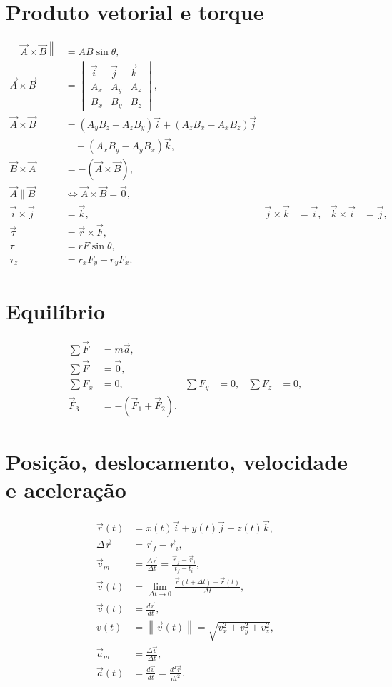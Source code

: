 \documentclass[12pt,a4paper]{article}
\newcommand{\vi}{\vec{i}}
\newcommand{\vj}{\vec{j}}
\newcommand{\vk}{\vec{k}}
\newcommand{\norm}[1]{\left\lVert #1\right\rVert}
\begin{document}
\section*{Produto vetorial e torque}
\begin{align*}
\norm{\vec A\times\vec B}&=AB\sin\theta,\\
\vec A\times\vec B
&=\begin{vmatrix}
\vi&\vj&\vk\\ A_x&A_y&A_z\\ B_x&B_y&B_z
\end{vmatrix},\\
\vec A\times\vec B
&=(A_yB_z-A_zB_y)\vi+(A_zB_x-A_xB_z)\vj\\
&\quad +(A_xB_y-A_yB_x)\vk,\\
\vec B\times\vec A&=-(\vec A\times\vec B),\\
\vec A\parallel\vec B&\Longleftrightarrow \vec A\times\vec B=\vec0,\\
\vi\times\vj&=\vk, & \vj\times\vk&=\vi, & \vk\times\vi&=\vj,\\
\vec\tau&=\vec r\times\vec F,\\
\tau&=rF\sin\theta,\\
\tau_z&=r_xF_y-r_yF_x.
\end{align*}

\section*{Equilíbrio}
\begin{align*}
\sum\vec F&=m\vec a,\\
\sum\vec F&=\vec0,\\
\sum F_x&=0, & \sum F_y&=0, & \sum F_z&=0,\\
\vec F_3&=-(\vec F_1+\vec F_2).
\end{align*}

\section*{Posição, deslocamento, velocidade e aceleração}
\begin{align*}
\vec r(t)&=x(t)\vi+y(t)\vj+z(t)\vk,\\
\Delta\vec r&=\vec r_f-\vec r_i,\\
\vec v_m&=\frac{\Delta\vec r}{\Delta t}
=\frac{\vec r_f-\vec r_i}{t_f-t_i},\\
\vec v(t)&=\lim_{\Delta t\to0}
\frac{\vec r(t+\Delta t)-\vec r(t)}{\Delta t},\\
\vec v(t)&=\frac{d\vec r}{dt},\\
v(t)&=\norm{\vec v(t)}=\sqrt{v_x^2+v_y^2+v_z^2},\\
\vec a_m&=\frac{\Delta\vec v}{\Delta t},\\
\vec a(t)&=\frac{d\vec v}{dt}=\frac{d^2\vec r}{dt^2}.
\end{align*}
\end{document}
